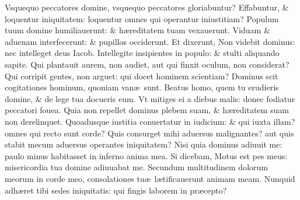 \documentclass[a5paper,10pt]{book}
\def\ae{æ}
\begin{document}
\begin{multicols*}{2}
\newline \color{red} V\color{black}squequo peccatores domine, vsquequo peccatores gloriabuntur?
\newline \color{red} E\color{black}ffabuntur, \& loquentur iniquitatem: loquentur omnes qui operantur iniustitiam?
\newline \color{red} P\color{black}opulum tuum domine humiliauerunt: \& h\ae reditatem tuam vexauerunt.
\newline \color{red} V\color{black}iduam \& aduenam interfecerunt: \& pupillos occiderunt.
\newline \color{red} E\color{black}t dixerunt, Non videbit dominus: nec intelleget deus Iacob.
\newline \color{red} I\color{black}ntellegite insipientes in populo: \& stulti aliquando sapite.
\newline \color{red} Q\color{black}ui plantauit aurem, non audiet, aut qui finxit oculum, non considerat?
\newline \color{red} Q\color{black}ui corripit gentes, non arguet: qui docet hominem scientiam?
\newline \color{red} D\color{black}ominus scit cogitationes hominum, quoniam van\ae \ sunt.
\newline \color{red} B\color{black}eatus homo, quem tu erudieris domine, \& de lege tua docueris eum.
\newline \color{red} V\color{black}t mitiges ei a diebus malis: donec fodiatur peccatori fouea.
\newline \color{red} Q\color{black}uia non repellet dominus plebem suam, \& h\ae reditatem suam non derelinquet.
\newline \color{red} Q\color{black}uoadusque iustitia conuertatur in iudicium: \& qui iuxta illam? omnes qui recto sunt corde?
\newline \color{red} Q\color{black}uis consurget mihi aduersus malignantes? aut quis stabit mecum aduersus operantes iniquitatem?
\newline \color{red} N\color{black}isi quia dominus adiuuit me: paulo minus habitasset in inferno anima mea.
\newline \color{red} S\color{black}i dicebam, Motus est pes meus: misericordia tua domine adiuuabat me.
\newline \color{red} S\color{black}ecundum multitudinem dolorum meorum in corde meo, consolationes tu\ae \ l\ae tificauerunt animam meam.
\newline \color{red} N\color{black}unquid adh\ae ret tibi sedes iniquitatis: qui fingis laborem in pr\ae cepto?

\end{multicols*}
\end{document}
